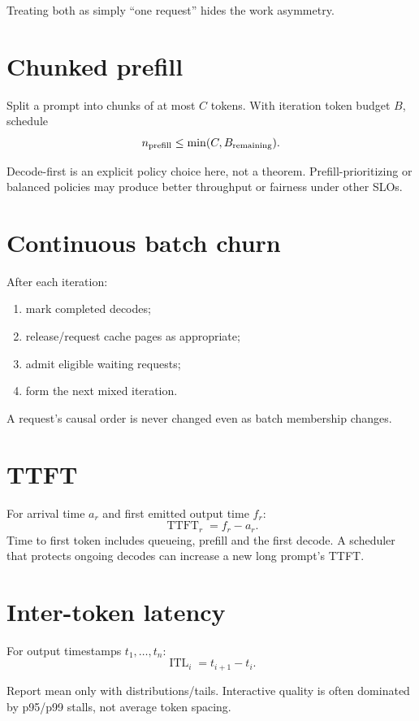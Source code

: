Treating both as simply ``one request'' hides the work asymmetry.

\section{Chunked prefill}
Split a prompt into chunks of at most $C$ tokens. With iteration token budget $B$, schedule
\[
n_{\rm prefill}\le \min(C,B_{\rm remaining}).
\]

Decode-first is an explicit policy choice here, not a theorem. Prefill-prioritizing or balanced policies may produce better throughput or fairness under other SLOs.

\section{Continuous batch churn}
After each iteration:
\begin{enumerate}
\item mark completed decodes;
\item release/request cache pages as appropriate;
\item admit eligible waiting requests;
\item form the next mixed iteration.
\end{enumerate}
A request's causal order is never changed even as batch membership changes.

\section{TTFT}
For arrival time $a_r$ and first emitted output time $f_r$:
\[
\operatorname{TTFT}_r=f_r-a_r.
\]
Time to first token includes queueing, prefill and the first decode. A scheduler that protects ongoing decodes can increase a new long prompt's TTFT.

\section{Inter-token latency}
For output timestamps $t_1,\ldots,t_n$:
\[
\operatorname{ITL}_i=t_{i+1}-t_i.
\]

Report mean only with distributions/tails. Interactive quality is often dominated by p95/p99 stalls, not average token spacing.

